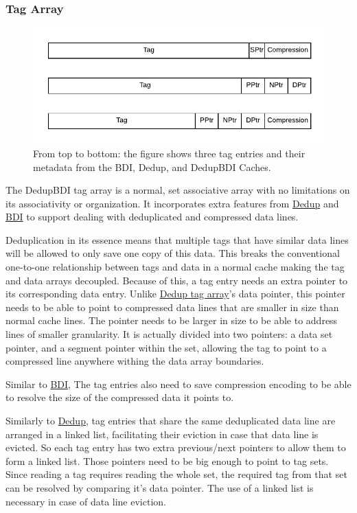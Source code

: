 \subsubsection{Tag Array}
\label{sssec:DedupBDITag}
\begin{figure}
    \includegraphics[width=\textwidth]{BDIvsDedupvsDedupBDI_Tag.pdf}
    \caption[DedupBDI Tag Array]{From top to bottom: the figure shows three tag entries and their metadata from the BDI, Dedup, and DedupBDI Caches.}
    \label{fig:DedupBDI_Tag}
\end{figure}
The DedupBDI tag array is a normal, set associative array with no limitations on its associativity or organization. It incorporates extra features from \hyperref[sssec:DedupTag]{Dedup} and \hyperref[sssec:BDITag]{BDI} to support dealing with deduplicated and compressed data lines.\par
Deduplication in its essence means that multiple tags that have similar data lines will be allowed to only save one copy of this data. This breaks the conventional one-to-one relationship between tags and data in a normal cache making the tag and data arrays decoupled. Because of this, a tag entry needs an extra pointer to its corresponding data entry. Unlike \hyperref[sssec:DedupTag]{Dedup tag array}'s data pointer, this pointer needs to be able to point to compressed data lines that are smaller in size than normal cache lines. The pointer needs to be larger in size to be able to address lines of smaller granularity. It is actually divided into two pointers: a data set pointer, and a segment pointer within the set, allowing the tag to point to a compressed line anywhere withing the data array boundaries.\par
Similar to \hyperref[sssec:BDITag]{BDI}, The tag entries also need to save compression encoding to be able to resolve the size of the compressed data it points to.\par
Similarly to \hyperref[sssec:DedupTag]{Dedup}, tag entries that share the same deduplicated data line are arranged in a linked list, facilitating their eviction in case that data line is evicted. So each tag entry has two extra previous/next pointers to allow them to form a linked list. Those pointers need to be big enough to point to tag sets. Since reading a tag requires reading the whole set, the required tag from that set can be resolved by comparing it's data pointer. The use of a linked list is necessary in case of data line eviction.\par

